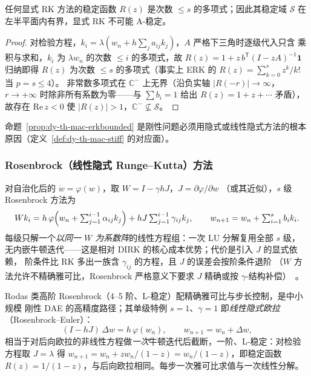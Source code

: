 \begin{proposition}[显式 RK 的稳定域必有界]\label{prop:dy-th-mac-erkbounded}
任何显式 RK 方法的稳定函数 $R(z)$ 是次数 $\le s$ 的多项式；因此其稳定域
$\mathcal S$ 在左半平面内有界，显式 RK 不可能 A-稳定。
\end{proposition}

\begin{proof}
对检验方程，$k_i=\lambda(w_n+h\sum_ja_{ij}k_j)$，$A$ 严格下三角时逐级代入只含
乘积与求和，$k_i$ 为 $\lambda w_n$ 的次数 $\le i$ 的多项式，故
$R(z)=1+z\,b^{\mathsf T}(I-zA)^{-1}\mathbf 1$ 归纳即得 $R(z)$ 为次数
$\le s$ 的多项式（事实上 ERK 的 $R(z)=\sum_{k=0}^{s}z^k/k!$ 当 $p=s\le4$）。
非常数多项式在 $\mathbb C^-$ 上无界（沿负实轴 $|R(-r)|\to\infty$，$r\to+\infty$
时除非所有系数为零——与 $\sum b_i=1$ 给出 $R(z)=1+z+\cdots$ 矛盾），故存在
$\mathrm{Re}\,z<0$ 使 $|R(z)|>1$，$\mathbb C^-\not\subseteq\mathcal S$。
\end{proof}

命题~\ref{prop:dy-th-mac-erkbounded} 是刚性问题必须用隐式或线性隐式方法的根本
原因（定义~\ref{def:dy-th-mac-stiff} 的对应面）。

\subsubsection{Rosenbrock（线性隐式 Runge--Kutta）方法}

\begin{definition}\label{def:dy-th-mac-rosenbrock}
对自治化后的 $\dot w=\varphi(w)$，取 $W=I-\gamma hJ$，$J=\partial\varphi/\partial w$
（或其近似），$s$ 级 Rosenbrock 方法为
\begin{equation}
Wk_i=h\,\varphi\Bigl(w_n+\textstyle\sum_{j=1}^{i-1}\alpha_{ij}k_j\Bigr)
+hJ\sum_{j=1}^{i-1}\gamma_{ij}k_j,
\qquad
w_{n+1}=w_n+\sum_{i=1}^{s}b_ik_i .
\label{eq:dy-th-mac-rosenbrock}
\end{equation}
每级只解一个\emph{以同一 $W$ 为系数阵}的线性方程组：一次 LU 分解复用全部 $s$ 级，
无内嵌牛顿迭代——这是相对 DIRK 的核心成本优势；代价是引入 $J$ 的显式依赖，
阶条件比 RK 多出一族含 $\gamma_{ij}$ 的方程，且 $J$ 的误差会按阶条件退阶
（$W$ 方法允许不精确雅可比，Rosenbrock 严格意义下要求 $J$ 精确或按
$\gamma$-结构补偿）~\cite{dym:hairer2}。
\end{definition}

\begin{remark}\label{rem:dy-th-mac-rosenbrock-use}
Rodas 类高阶 Rosenbrock（4--5 阶、L-稳定）配精确雅可比与步长控制，是中小规模
刚性 DAE 的高精度路径；其单级特例 $s=1$、$\gamma=1$ 即\emph{线性隐式欧拉}
（Rosenbrock--Euler）：
\begin{equation}
(I-hJ)\,\Delta w=h\,\varphi(w_n),\qquad w_{n+1}=w_n+\Delta w ,
\label{eq:dy-th-mac-roseuler}
\end{equation}
相当于对后向欧拉的非线性方程做\emph{一次}牛顿迭代后截断，一阶、L-稳定：对检验
方程取 $J=\lambda$ 得 $w_{n+1}=w_n+zw_n/(1-z)=w_n/(1-z)$，即稳定函数
$R(z)=1/(1-z)$，与后向欧拉相同。每步一次雅可比求值与一次线性分解。
\end{remark}


